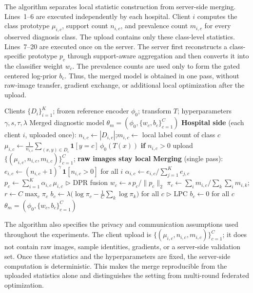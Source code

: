 \documentclass[letterpaper]{article}
\theoremstyle{definition}
\theoremstyle{plain}
\begin{document}
The algorithm separates local statistic construction from server-side merging. Lines~1--6 are executed independently by each hospital. Client \(i\) computes the class prototype \(\mu_{i,c}\), support count \(n_{i,c}\), and prevalence count \(m_{i,c}\) for every observed diagnosis class. The upload contains only these class-level statistics. Lines~7--20 are executed once on the server. The server first reconstructs a class-specific prototype \(p_c\) through support-aware aggregation and then converts it into the classifier weight \(w_c\). The prevalence counts are used only to form the gated centered log-prior \(b_c\). Thus, the merged model is obtained in one pass, without raw-image transfer, gradient exchange, or additional local optimization after the upload.

\begin{algorithm}[!t]
\caption{LAMP-Merge}
\label{app:alg:lamp}
\begin{algorithmic}[1]
\REQUIRE Clients $\{D_i\}_{i=1}^{K}$; frozen reference encoder $\phi_0$; transform $T$; hyperparameters $\gamma,s,\tau,\lambda$
\ENSURE Merged diagnostic model $\theta_m=(\phi_0,\{w_c,b_c\}_{c=1}^{C})$
\STATE \textbf{Hospital side} (each client $i$, uploaded once):
    \STATE $n_{i,c}\leftarrow |D_{i,c}|$;\quad $m_{i,c}\leftarrow$ local label count of class $c$
    \STATE $\mu_{i,c}\leftarrow \frac{1}{n_{i,c}}\sum_{(x,y)\in D_i}\mathbf{1}[y=c]\,\phi_0(T(x))$ \quad\textbf{if } $n_{i,c}>0$
\ENDFOR
\STATE upload $\{(\mu_{i,c},n_{i,c},m_{i,c})\}_{c=1}^{C}$; \textbf{raw images stay local}
\STATE \textbf{Merging} (single pass):
    \STATE $e_{i,c}\leftarrow (n_{i,c}+1)^{\gamma}\,\mathbf{1}[n_{i,c}>0]$ for all $i$
    \STATE $\alpha_{i,c}\leftarrow e_{i,c}\big/\sum_{j=1}^{K} e_{j,c}$
    \STATE $p_c\leftarrow \sum_{i=1}^{K}\alpha_{i,c}\,\mu_{i,c}$ \hfill $\triangleright$ DPR fusion
    \STATE $w_c\leftarrow s\,p_c/\|p_c\|_2$
\ENDFOR
\STATE $\pi_c\leftarrow \sum_{i} m_{i,c}\big/\sum_{k}\sum_{i} m_{i,k}$;\quad $r\leftarrow C\max_c \pi_c$
    \STATE $b_c\leftarrow \lambda\big(\log\pi_c-\frac{1}{C}\sum_{k}\log\pi_k\big)$ for all $c$ \hfill $\triangleright$ LPC
\ELSE
    \STATE $b_c\leftarrow 0$ for all $c$
\ENDIF
\RETURN $\theta_m=(\phi_0,\{w_c,b_c\}_{c=1}^{C})$
\end{algorithmic}
\end{algorithm}

The algorithm also specifies the privacy and communication assumptions used throughout the experiments. The client upload is \(\{(\mu_{i,c},n_{i,c},m_{i,c})\}_{c=1}^{C}\); it does not contain raw images, sample identities, gradients, or a server-side validation set. Once these statistics and the hyperparameters are fixed, the server-side computation is deterministic. This makes the merge reproducible from the uploaded statistics alone and distinguishes the setting from multi-round federated optimization.
\end{document}
